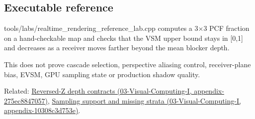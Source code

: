 \subsection{Executable reference}\label{appendix-7cac8a689849-executable-reference}

tools/labs/realtime\_rendering\_reference\_lab.cpp computes a 3×3 PCF fraction on a hand-checkable map and checks that the VSM upper bound stays in {[}0,1{]} and decreases as a receiver moves farther beyond the mean blocker depth.

This does not prove cascade selection, perspective aliasing control, receiver-plane bias, EVSM, GPU sampling state or production shadow quality.

Related: \href{../03-Visual-Computing-I/main.pdf\#nameddest=appendix-275ec8847057}{Reversed-Z depth contracts (03-Visual-Computing-I, appendix-275ec8847057)}, \href{../03-Visual-Computing-I/main.pdf\#nameddest=appendix-10308c3d753e}{Sampling support and missing strata (03-Visual-Computing-I, appendix-10308c3d753e)}.
